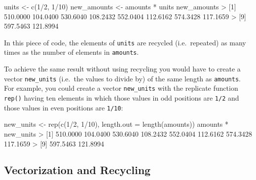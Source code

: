 \documentclass[
]{book}
\newenvironment{Shaded}{\begin{snugshade}}{\end{snugshade}}
\newcommand{\AttributeTok}[1]{\textcolor[rgb]{0.77,0.63,0.00}{#1}}
\newcommand{\DecValTok}[1]{\textcolor[rgb]{0.00,0.00,0.81}{#1}}
\newcommand{\FloatTok}[1]{\textcolor[rgb]{0.00,0.00,0.81}{#1}}
\newcommand{\FunctionTok}[1]{\textcolor[rgb]{0.00,0.00,0.00}{#1}}
\newcommand{\NormalTok}[1]{#1}
\newcommand{\OtherTok}[1]{\textcolor[rgb]{0.56,0.35,0.01}{#1}}
\newcommand{\SpecialCharTok}[1]{\textcolor[rgb]{0.00,0.00,0.00}{#1}}
\begin{document}
\begin{Shaded}
\begin{Highlighting}[]
\NormalTok{units }\OtherTok{\textless{}{-}} \FunctionTok{c}\NormalTok{(}\DecValTok{1}\SpecialCharTok{/}\DecValTok{2}\NormalTok{, }\DecValTok{1}\SpecialCharTok{/}\DecValTok{10}\NormalTok{)}
\NormalTok{new\_amounts }\OtherTok{\textless{}{-}}\NormalTok{ amounts }\SpecialCharTok{*}\NormalTok{ units}
\NormalTok{new\_amounts}
\SpecialCharTok{\textgreater{}}\NormalTok{  [}\DecValTok{1}\NormalTok{] }\FloatTok{510.0000} \FloatTok{104.0400} \FloatTok{530.6040} \FloatTok{108.2432} \FloatTok{552.0404} \FloatTok{112.6162} \FloatTok{574.3428} \FloatTok{117.1659}
\SpecialCharTok{\textgreater{}}\NormalTok{  [}\DecValTok{9}\NormalTok{] }\FloatTok{597.5463} \FloatTok{121.8994}
\end{Highlighting}
\end{Shaded}

In this piece of code, the elements of \texttt{units} are recycled (i.e.~repeated) as
many times as the number of elements in \texttt{amounts}.

To achieve the same result without using recycling you would have to create a
vector \texttt{new\_units} (i.e.~the values to divide by) of the same length as \texttt{amounts}.
For example, you could create a vector \texttt{new\_units} with the replicate function
\texttt{rep()} having ten elements in which those values in odd positions are \texttt{1/2}
and those values in even positions are \texttt{1/10}:

\begin{Shaded}
\begin{Highlighting}[]
\NormalTok{new\_units }\OtherTok{\textless{}{-}} \FunctionTok{rep}\NormalTok{(}\FunctionTok{c}\NormalTok{(}\DecValTok{1}\SpecialCharTok{/}\DecValTok{2}\NormalTok{, }\DecValTok{1}\SpecialCharTok{/}\DecValTok{10}\NormalTok{), }\AttributeTok{length.out =} \FunctionTok{length}\NormalTok{(amounts))}
\NormalTok{amounts }\SpecialCharTok{*}\NormalTok{ new\_units}
\SpecialCharTok{\textgreater{}}\NormalTok{  [}\DecValTok{1}\NormalTok{] }\FloatTok{510.0000} \FloatTok{104.0400} \FloatTok{530.6040} \FloatTok{108.2432} \FloatTok{552.0404} \FloatTok{112.6162} \FloatTok{574.3428} \FloatTok{117.1659}
\SpecialCharTok{\textgreater{}}\NormalTok{  [}\DecValTok{9}\NormalTok{] }\FloatTok{597.5463} \FloatTok{121.8994}
\end{Highlighting}
\end{Shaded}

\hypertarget{vectorization-and-recycling}{%
\subsection{Vectorization and Recycling}\label{vectorization-and-recycling}}
\end{document}

